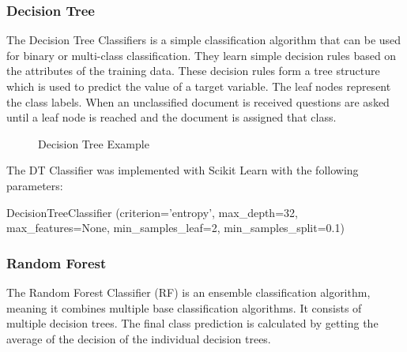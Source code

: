 \subsubsection*{Decision Tree}

The Decision Tree Classifiers is a simple classification algorithm that can be used for binary or multi-class classification. They learn simple decision rules based on the attributes of the training data. These decision rules form a tree structure which is used to predict the value of a target variable. The leaf nodes represent the class labels. When an unclassified document is received questions are asked until a leaf node is reached and the document is assigned that class.

\begin{figure}[h!]
\centering
{}
\caption{\label{fig:decisiontree} Decision Tree Example}
\end{figure}

The DT Classifier was implemented with Scikit Learn with the following parameters:

\begin{tcolorbox}
\begin{center}
	DecisionTreeClassifier (criterion='entropy', max\_depth=32, max\_features=None, min\_samples\_leaf=2, min\_samples\_split=0.1)
\end{center}
\end{tcolorbox}

\subsubsection*{Random Forest}


The Random Forest Classifier (RF) is an ensemble classification algorithm, meaning it combines multiple base classification algorithms. It consists of multiple decision trees. The final class prediction is calculated by getting the average of the decision of the individual decision trees.

